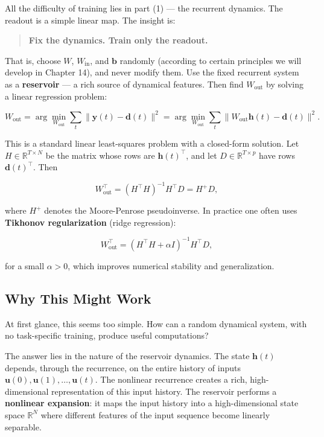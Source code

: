All the difficulty of training lies in part (1) --- the recurrent dynamics. The readout is a simple linear map. The insight is:

\begin{quote}
\textbf{Fix the dynamics. Train only the readout.}
\end{quote}

That is, choose $W$, $W_{\text{in}}$, and $\mathbf{b}$ randomly (according to certain principles we will develop in Chapter 14), and never modify them. Use the fixed recurrent system as a \textbf{reservoir} --- a rich source of dynamical features. Then find $W_{\text{out}}$ by solving a linear regression problem:

\[
W_{\text{out}} = \arg\min_{W_{\text{out}}} \sum_{t} \|\mathbf{y}(t) - \mathbf{d}(t)\|^2 = \arg\min_{W_{\text{out}}} \sum_{t} \|W_{\text{out}} \mathbf{h}(t) - \mathbf{d}(t)\|^2.
\]

This is a standard linear least-squares problem with a closed-form solution. Let $H \in \mathbb{R}^{T \times N}$ be the matrix whose rows are $\mathbf{h}(t)^\top$, and let $D \in \mathbb{R}^{T \times p}$ have rows $\mathbf{d}(t)^\top$. Then

\[
W_{\text{out}}^\top = (H^\top H)^{-1} H^\top D = H^+ D,
\]

where $H^+$ denotes the Moore-Penrose pseudoinverse. In practice one often uses \textbf{Tikhonov regularization} (ridge regression):

\[
W_{\text{out}}^\top = (H^\top H + \alpha I)^{-1} H^\top D,
\]

for a small $\alpha > 0$, which improves numerical stability and generalization.

\subsection{Why This Might Work}\label{sec:13.4.2}

At first glance, this seems too simple. How can a random dynamical system, with no task-specific training, produce useful computations?

The answer lies in the nature of the reservoir dynamics. The state $\mathbf{h}(t)$ depends, through the recurrence, on the entire history of inputs $\mathbf{u}(0), \mathbf{u}(1), \ldots, \mathbf{u}(t)$. The nonlinear recurrence creates a rich, high-dimensional representation of this input history. The reservoir performs a \textbf{nonlinear expansion}: it maps the input history into a high-dimensional state space $\mathbb{R}^N$ where different features of the input sequence become linearly separable.

